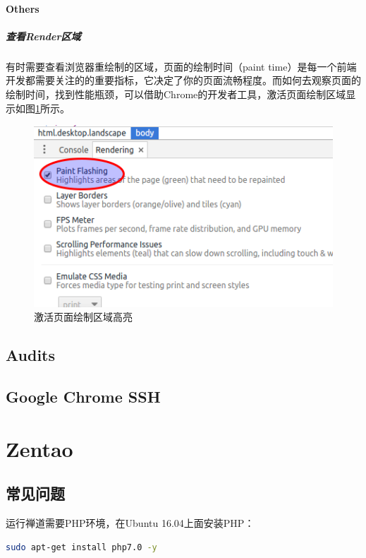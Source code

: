 \documentclass[letter]{book}
\begin{document}
\paragraph{Others}

\subparagraph{查看Render区域}

有时需要查看浏览器重绘制的区域，页面的绘制时间（paint time）是每一个前端开发都需要关注的的重要指标，它决定了你的页面流畅程度。而如何去观察页面的绘制时间，找到性能瓶颈，可以借助Chrome的开发者工具，激活页面绘制区域显示如图\ref{fig:pagepainting}所示。

\begin{figure}[htbp]
	\centering
	\includegraphics[scale=0.6]{pagepainting.png}
	\caption{激活页面绘制区域高亮}
	\label{fig:pagepainting}
\end{figure}

\subsection{Audits}



\subsection{Google Chrome SSH}

\section{Zentao}

\subsection{常见问题}

运行禅道需要PHP环境，在Ubuntu 16.04上面安装PHP：

\begin{lstlisting}[language=Bash]
sudo apt-get install php7.0 -y
\end{lstlisting}
\end{document}
